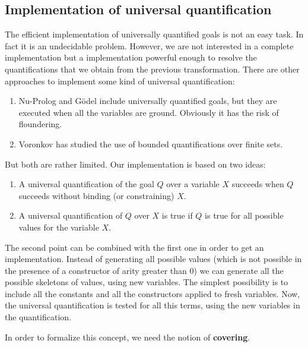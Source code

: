 \documentclass[]{llncs}
\begin{document}
\subsection{Implementation of universal quantification}
The efficient implementation of universally quantified goals is not an
easy task. In fact it is an undecidable problem. However,
we are not interested in a complete implementation but a
implementation powerful enough to resolve the quantifications that we
obtain from the previous transformation. There are other approaches to
implement some kind of universal quantification:
\begin{enumerate}
\item Nu-Prolog \cite{Naish} and G\"{o}del \cite{Goedel} include
universally quantified goals, but they are executed when
all the variables are ground. Obviously it has the risk of
floundering.
\item Voronkov \cite{Voronkov} has studied
the use of bounded quantifications over finite sets.
\end{enumerate}

\noindent
But both are rather limited. Our implementation is based on two ideas:
\begin{enumerate}
\item A universal quantification of the goal $Q$ over a
variable $X$ succeeds when $Q$ succeeds without
binding (or constraining) $X$.
\item A universal quantification of $Q$ over $X$ is true
if $Q$ is true for all possible values for the variable $X$.
\end{enumerate}

The second point can be combined with the first one
in order to get an implementation. Instead of generating
all possible values (which is not possible in the presence
of a constructor of arity greater than 0) we can generate
all the possible skeletons of values, using new
variables. The simplest possibility is to include all the
constants and all the constructors applied to fresh
variables. Now, the universal quantification is tested for
all this terms, using the new variables in the
quantification.

In order to formalize this concept, we need the notion of
{\bf covering}.
\end{document}
